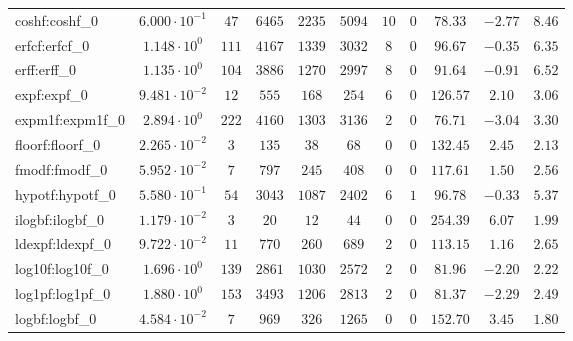 \begin{tabular}{|l|c|c|c|c|c|c|c|c|c|c|}
coshf:coshf\_0               & $ 6.000 \cdot 10^{-1} $ & $ 47     $ & $ 6465   $ & $ 2235  $ & $ 5094  $ & $ 10  $ & $ 0 $ & $ 78.33       $ & $ -2.77   $ & $ 8.46    $ \\
erfcf:erfcf\_0               & $ 1.148 \cdot 10^{0}  $ & $ 111    $ & $ 4167   $ & $ 1339  $ & $ 3032  $ & $ 8   $ & $ 0 $ & $ 96.67       $ & $ -0.35   $ & $ 6.35    $ \\
erff:erff\_0                 & $ 1.135 \cdot 10^{0}  $ & $ 104    $ & $ 3886   $ & $ 1270  $ & $ 2997  $ & $ 8   $ & $ 0 $ & $ 91.64       $ & $ -0.91   $ & $ 6.52    $ \\
expf:expf\_0                 & $ 9.481 \cdot 10^{-2} $ & $ 12     $ & $ 555    $ & $ 168   $ & $ 254   $ & $ 6   $ & $ 0 $ & $ 126.57      $ & $ 2.10    $ & $ 3.06    $ \\
expm1f:expm1f\_0             & $ 2.894 \cdot 10^{0}  $ & $ 222    $ & $ 4160   $ & $ 1303  $ & $ 3136  $ & $ 2   $ & $ 0 $ & $ 76.71       $ & $ -3.04   $ & $ 3.30    $ \\
floorf:floorf\_0             & $ 2.265 \cdot 10^{-2} $ & $ 3      $ & $ 135    $ & $ 38    $ & $ 68    $ & $ 0   $ & $ 0 $ & $ 132.45      $ & $ 2.45    $ & $ 2.13    $ \\
fmodf:fmodf\_0               & $ 5.952 \cdot 10^{-2} $ & $ 7      $ & $ 797    $ & $ 245   $ & $ 408   $ & $ 0   $ & $ 0 $ & $ 117.61      $ & $ 1.50    $ & $ 2.56    $ \\
hypotf:hypotf\_0             & $ 5.580 \cdot 10^{-1} $ & $ 54     $ & $ 3043   $ & $ 1087  $ & $ 2402  $ & $ 6   $ & $ 1 $ & $ 96.78       $ & $ -0.33   $ & $ 5.37    $ \\
ilogbf:ilogbf\_0             & $ 1.179 \cdot 10^{-2} $ & $ 3      $ & $ 20     $ & $ 12    $ & $ 44    $ & $ 0   $ & $ 0 $ & $ 254.39      $ & $ 6.07    $ & $ 1.99    $ \\
ldexpf:ldexpf\_0             & $ 9.722 \cdot 10^{-2} $ & $ 11     $ & $ 770    $ & $ 260   $ & $ 689   $ & $ 2   $ & $ 0 $ & $ 113.15      $ & $ 1.16    $ & $ 2.65    $ \\
log10f:log10f\_0             & $ 1.696 \cdot 10^{0}  $ & $ 139    $ & $ 2861   $ & $ 1030  $ & $ 2572  $ & $ 2   $ & $ 0 $ & $ 81.96       $ & $ -2.20   $ & $ 2.22    $ \\
log1pf:log1pf\_0             & $ 1.880 \cdot 10^{0}  $ & $ 153    $ & $ 3493   $ & $ 1206  $ & $ 2813  $ & $ 2   $ & $ 0 $ & $ 81.37       $ & $ -2.29   $ & $ 2.49    $ \\
logbf:logbf\_0               & $ 4.584 \cdot 10^{-2} $ & $ 7      $ & $ 969    $ & $ 326   $ & $ 1265  $ & $ 0   $ & $ 0 $ & $ 152.70      $ & $ 3.45    $ & $ 1.80    $ \\

\end{tabular}
